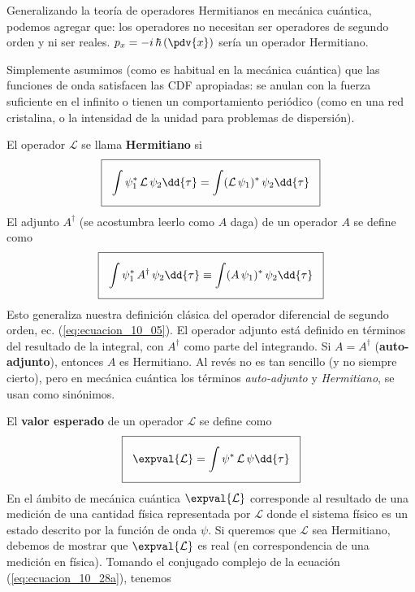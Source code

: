 Generalizando la teoría de operadores Hermitianos en mecánica cuántica, podemos agregar que: los operadores no necesitan ser operadores de segundo orden y ni ser reales. $\displaystyle p_{x} = - i \, \hbar \left(\pdv{x}\right)$ sería un operador Hermitiano.
\par
Simplemente asumimos (como es habitual en la mecánica cuántica) que las funciones de onda satisfacen las CDF apropiadas: se anulan con la fuerza suficiente en el infinito o tienen un comportamiento periódico (como en una red cristalina, o la intensidad de la unidad para problemas de dispersión). 
\par
El operador $\mathcal{L}$ se llama \textbf{Hermitiano} si
\begin{align}
\setlength{\fboxsep}{3\fboxsep}\boxed{\int \psi_{1}^{*} \, \mathcal{L} \, \psi_{2} \dd{\tau} =  \int (\mathcal{L} \, \psi_{1})^{*} \, \psi_{2} \dd{\tau}}
\label{eq:ecuacion_10_26}
\end{align}
El adjunto $A^{\dagger}$ (se acostumbra leerlo como $A$ daga) de un operador $A$ se define como 
\begin{align}
\setlength{\fboxsep}{3\fboxsep}\boxed{\int \psi_{1}^{*} \, A^{\dagger} \, \psi_{2} \dd{\tau} \equiv \int (A \, \psi_{1})^{*} \, \psi_{2} \dd{\tau}}
\label{eq:ecuacion_10_27}
\end{align}
Esto generaliza nuestra definición clásica del operador diferencial de segundo orden, ec. (\ref{eq:ecuacion_10_05}). El operador adjunto está definido en términos del resultado de la integral, con $A^{\dagger}$ como parte del integrando. Si $A = A^{\dagger}$ (\textbf{auto-adjunto}), entonces $A$ es Hermitiano. Al revés no es tan sencillo (y no siempre cierto), pero en mecánica cuántica los términos \emph{auto-adjunto} y \emph{Hermitiano}, se usan como sinónimos.
\par
El \textbf{valor esperado} de un operador $\mathcal{L}$ se define como
\begin{align}
\setlength{\fboxsep}{3\fboxsep}\boxed{\expval{\mathcal{L}} = \int \psi^{*} \, \mathcal{L} \, \psi \dd{\tau}}
\label{eq:ecuacion_10_28a}
\end{align}
En el ámbito de mecánica cuántica $\expval{\mathcal{L}}$ corresponde al resultado de una medición de una cantidad física representada por $\mathcal{L}$ donde el sistema físico es un estado descrito por la función de onda $\psi$. Si queremos que $\mathcal{L}$ sea Hermitiano, debemos de mostrar que $\expval{\mathcal{L}}$ es real (en correspondencia de una medición en física). Tomando el conjugado complejo de la ecuación (\ref{eq:ecuacion_10_28a}), tenemos
